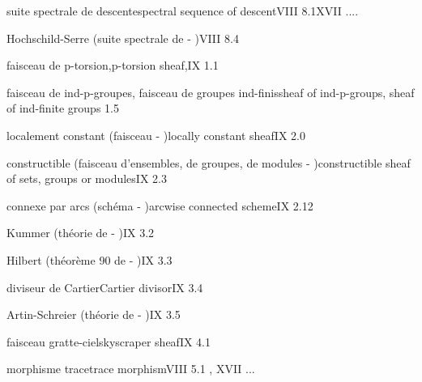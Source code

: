 suite spectrale de descente\quad spectral sequence of descent\quad VIII 8.1\quad XVII ....
\margin{\handwritten{*}}

Hochschild-Serre (suite spectrale de - )\quad VIII 8.4

\quad {}

faisceau de p-torsion,\quad p-torsion sheaf,\quad IX 1.1


faisceau de ind-p-groupes, faisceau de groupes ind-finis\quad sheaf of ind-p-groups, sheaf of ind-finite groups\quad {} 1.5

localement constant (faisceau - )\quad locally constant sheaf\quad IX 2.0

constructible (faisceau d'ensembles, de groupes, de modules - )\quad constructible \deleted{\unsure{(}} sheaf of sets, groups or modules\deleted{)}\quad IX 2.3

connexe par arcs (schéma - )\quad arcwise connected scheme\quad IX 2.12

Kummer (théorie de - )\quad IX 3.2


Hilbert (théorème 90 de - )\quad IX 3.3

diviseur de Cartier\quad Cartier divisor\quad IX 3.4

Artin-Schreier (théorie de - )\quad IX 3.5


faisceau gratte-ciel\quad skyscraper sheaf\quad IX 4.1

morphisme trace\quad trace morphism\quad VIII 5.1 , XVII ...
\margin{\handwritten{*}}


